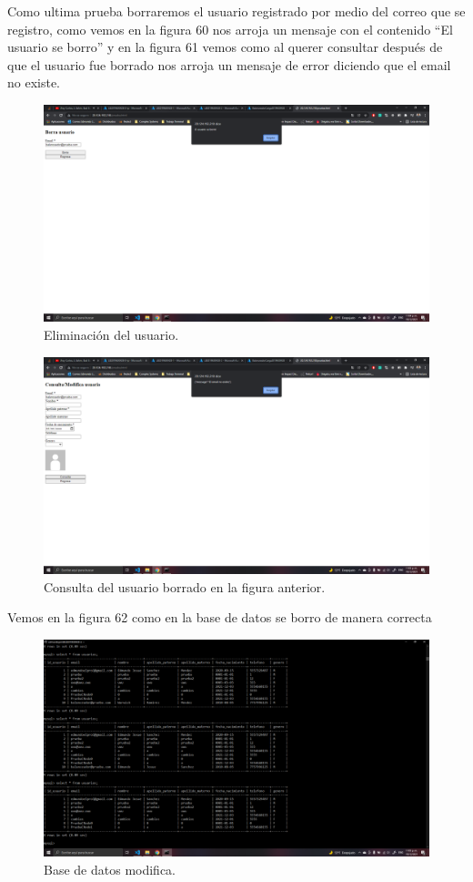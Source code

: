 \documentclass[11pt]{article}
\begin{document}
		Como ultima prueba borraremos el usuario registrado por medio del correo que se registro, como vemos en la figura 60 nos arroja un mensaje con el contenido ``El usuario se borro'' y en la figura 61 vemos como al querer consultar después de que el usuario fue borrado nos arroja un mensaje de error diciendo que el email no existe.
		\begin{figure}[H]
			\centering
			\includegraphics[scale=0.34]{resources/prueba6.png}
			\caption{Eliminación del usuario.}\label{fig:picture}
		\end{figure}
		\begin{figure}[H]
			\centering
			\includegraphics[scale=0.34]{resources/prueba6.1.png}
			\caption{Consulta del usuario borrado en la figura anterior.}\label{fig:picture}
		\end{figure}
		Vemos en la figura 62 como en la base de datos se borro de manera correcta
		\begin{figure}[H]
			\centering
			\includegraphics[scale=0.34]{resources/prueba6.2.png}
			\caption{Base de datos modifica.}\label{fig:picture}
		\end{figure}
\end{document}
